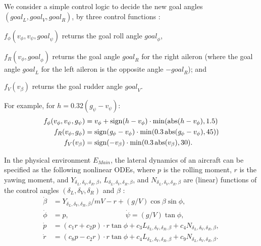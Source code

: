 We consider a simple control logic to decide 
the new goal angles $(\mathit{goal}_L,\mathit{goal}_V,\mathit{goal}_R)$,
by three control functions \cite{ftscs-journal}:
%
\begin{inparaenum}[(i)]
	\item $f_\phi(v_\phi, v_\psi, \mathit{goal}_\psi)$
		returns the goal roll angle $\mathit{goal}_\phi$,
	\item $f_{R}(v_\phi, \mathit{goal}_\phi)$ returns the goal angle $\mathit{goal}_R$ for the right aileron
	(where the goal angle $\mathit{goal}_L$ for the left aileron is the opposite angle $- \mathit{goal}_R$);
	and
	\item $f_V(v_\beta)$ returns the goal rudder angle $\mathit{goal}_V$.
\end{inparaenum}
For example, for $h = 0.32  (\mathit{g}_\psi - v_\psi)$:
\begin{align*}
f_\phi(v_\phi, v_\psi, g_\psi) &= 
v_\phi + \mathrm{sign}(h - v_\phi) \cdot \min(\mathrm{abs}(h - v_\phi),1.5)
\\
f_{R}(v_\phi, g_\phi) &=
\mathrm{sign}(\mathit{g}_\phi - v_\phi)\cdot \min(0.3 \,\mathrm{abs}(\mathit{g}_\phi - v_\phi), 45))
\\
f_V(v_\beta) &=
\mathrm{sign}(-v_\beta)\cdot \min(0.3  \,\mathrm{abs}(v_\beta), 30).
\end{align*}

In the physical environment $E_\mathit{Main}$,
the lateral dynamics of an aircraft
can be specified as the following nonlinear ODEs,
where $p$ is the rolling moment, $r$ is the yawing moment,
and $Y_{\delta_L,\delta_V,\delta_R,\beta}$, $L_{\delta_L,\delta_V,\delta_R,\beta}$, and $N_{\delta_L,\delta_V,\delta_R,\beta}$
are (linear) functions of the control angles $(\delta_L,\delta_V,\delta_R)$ 
and $\beta$
\cite{stevens2003aircraft}:
%
\begin{align*}
\dot{\beta} &= Y_{\delta_L,\delta_V,\delta_R,\beta} / m V - r + (g / V) \cos \beta \sin \phi,
\\
\dot{\phi} &= p,
\qquad\qquad\qquad\qquad
\dot{\psi} = (g / V) \tan \phi,
\\
\dot{p} &= (c_1 r + c_2 p) \cdot r  \tan \phi + c_3 L_{\delta_L,\delta_V,\delta_R,\beta} + c_4 N_{\delta_L,\delta_V,\delta_R,\beta},
\\
\dot{r} &= (c_8 p - c_2 r)  \cdot r  \tan \phi + c_4 L_{\delta_L,\delta_V,\delta_R,\beta} + c_9 N_{\delta_L,\delta_V,\delta_R,\beta}.
\end{align*}
%


